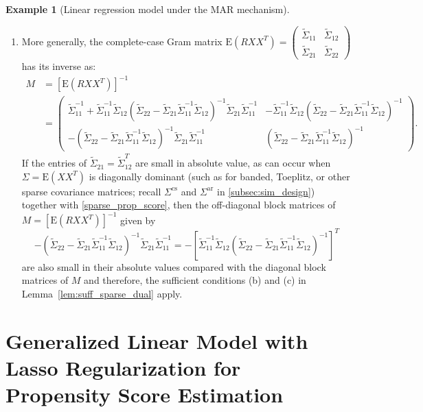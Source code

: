 \documentclass[ejsv2,noshowframe]{imsart}
\theoremstyle{plain}
\theoremstyle{definition}
\newtheorem*{example}{Example}
\theoremstyle{remark}
\renewcommand{\tilde}{\widetilde}
\begin{document}
\begin{example}[Linear regression model under the MAR mechanism]
\begin{enumerate}
		\item More generally, the complete-case Gram matrix $\mathrm{E}(RXX^T)= \begin{pmatrix}
			\tilde{\Sigma}_{11} & \tilde{\Sigma}_{12}\\
			\tilde{\Sigma}_{21} & \tilde{\Sigma}_{22}
		\end{pmatrix}$ has its inverse as:
		\begin{align*}
			M &=\left[\mathrm{E}(RXX^T) \right]^{-1} \\
			&= \begin{pmatrix}
				\tilde{\Sigma}_{11}^{-1} + \tilde{\Sigma}_{11}^{-1} \tilde{\Sigma}_{12} \left(\tilde{\Sigma}_{22} - \tilde{\Sigma}_{21} \tilde{\Sigma}_{11}^{-1} \tilde{\Sigma}_{12} \right)^{-1} \tilde{\Sigma}_{21} \tilde{\Sigma}_{11}^{-1}  &  -\tilde{\Sigma}_{11}^{-1} \tilde{\Sigma}_{12} \left(\tilde{\Sigma}_{22} - \tilde{\Sigma}_{21} \tilde{\Sigma}_{11}^{-1} \tilde{\Sigma}_{12} \right)^{-1}\\
				-\left(\tilde{\Sigma}_{22} - \tilde{\Sigma}_{21} \tilde{\Sigma}_{11}^{-1} \tilde{\Sigma}_{12} \right)^{-1} \tilde{\Sigma}_{21} \tilde{\Sigma}_{11}^{-1} & \left(\tilde{\Sigma}_{22} - \tilde{\Sigma}_{21} \tilde{\Sigma}_{11}^{-1} \tilde{\Sigma}_{12} \right)^{-1}
			\end{pmatrix}.
		\end{align*}
			If the entries of $\tilde{\Sigma}_{21} = \tilde{\Sigma}_{12}^T$ are small in absolute value, as can occur when $\Sigma=\mathrm{E}(XX^T)$ is diagonally dominant (such as for banded, Toeplitz, or other sparse covariance matrices; recall $\Sigma^{\mathrm{cs}}$ and $\Sigma^{\mathrm{ar}}$ in \autoref{subsec:sim_design}) together with \eqref{sparse_prop_score}, then the off-diagonal block matrices of $M=\left[\mathrm{E}(RXX^T) \right]^{-1}$ given by
		$$-\left(\tilde{\Sigma}_{22} - \tilde{\Sigma}_{21} \tilde{\Sigma}_{11}^{-1} \tilde{\Sigma}_{12} \right)^{-1} \tilde{\Sigma}_{21} \tilde{\Sigma}_{11}^{-1} = -\left[\tilde{\Sigma}_{11}^{-1} \tilde{\Sigma}_{12} \left(\tilde{\Sigma}_{22} - \tilde{\Sigma}_{21} \tilde{\Sigma}_{11}^{-1} \tilde{\Sigma}_{12} \right)^{-1} \right]^T$$
		are also small in their absolute values compared with the diagonal block matrices of $M$ and therefore, the sufficient conditions (b) and (c) in Lemma~\ref{lem:suff_sparse_dual} apply.
	\end{enumerate}
\end{example}

\section{Generalized Linear Model with Lasso Regularization for Propensity Score Estimation}
\label{app:prop_score_lasso}
\end{document}
